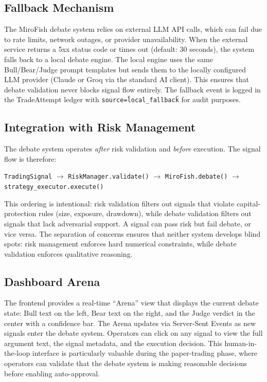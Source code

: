 \subsection{Fallback Mechanism}

The MiroFish debate system relies on external LLM API calls, which can fail due to rate limits, network outages, or provider unavailability. When the external service returns a 5xx status code or times out (default: 30 seconds), the system falls back to a local debate engine. The local engine uses the same Bull/Bear/Judge prompt templates but sends them to the locally configured LLM provider (Claude or Groq via the standard AI client). This ensures that debate validation never blocks signal flow entirely. The fallback event is logged in the TradeAttempt ledger with \texttt{source=\"local\_fallback\"} for audit purposes.

\subsection{Integration with Risk Management}

The debate system operates \emph{after} risk validation and \emph{before} execution. The signal flow is therefore:

\begin{center}
\texttt{TradingSignal} $\rightarrow$ \texttt{RiskManager.validate()} $\rightarrow$ \texttt{MiroFish.debate()} $\rightarrow$ \texttt{strategy\_executor.execute()}
\end{center}

This ordering is intentional: risk validation filters out signals that violate capital-protection rules (size, exposure, drawdown), while debate validation filters out signals that lack adversarial support. A signal can pass risk but fail debate, or vice versa. The separation of concerns ensures that neither system develops blind spots: risk management enforces hard numerical constraints, while debate validation enforces qualitative reasoning.

\subsection{Dashboard Arena}

The frontend provides a real-time ``Arena'' view that displays the current debate state: Bull text on the left, Bear text on the right, and the Judge verdict in the center with a confidence bar. The Arena updates via Server-Sent Events as new signals enter the debate system. Operators can click on any signal to view the full argument text, the signal metadata, and the execution decision. This human-in-the-loop interface is particularly valuable during the paper-trading phase, where operators can validate that the debate system is making reasonable decisions before enabling auto-approval.

